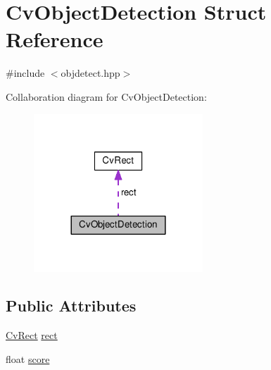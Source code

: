 \hypertarget{structCvObjectDetection}{\section{Cv\-Object\-Detection Struct Reference}
\label{structCvObjectDetection}
}


{\ttfamily \#include $<$objdetect.\-hpp$>$}



Collaboration diagram for Cv\-Object\-Detection\-:\nopagebreak
\begin{figure}[H]
\begin{center}
\leavevmode
\includegraphics[width=180pt]{structCvObjectDetection__coll__graph}
\end{center}
\end{figure}
\subsection*{Public Attributes}
\begin{DoxyCompactItemize}
\item 
\hyperlink{structCvRect}{Cv\-Rect} \hyperlink{structCvObjectDetection_a35f7ebdb5c485fffa439de21453d31f1}{rect}
\item 
float \hyperlink{structCvObjectDetection_a4afc4db52d02e6fa5a65d443df7b2a60}{score}
\end{DoxyCompactItemize}


